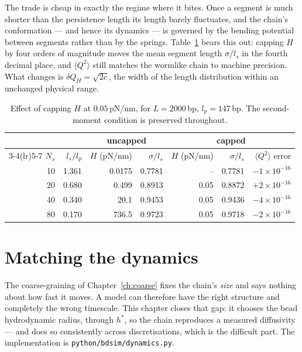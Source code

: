 \documentclass[11pt,a4paper]{report}
\newcommand{\code}[1]{\texttt{\seqsplitcode{#1}}}
\newcommand{\seqsplitcode}[1]{#1}
\begin{document}
The trade is cheap in exactly the regime where it bites. Once a segment is much
shorter than the persistence length its length barely fluctuates, and the chain's
conformation --- and hence its dynamics --- is governed by the bending potential
between segments rather than by the springs. Table~\ref{tab:hcap} bears this out:
capping $H$ by four orders of magnitude moves the mean segment length
$\sigma/l_s$ in the fourth decimal place, and $\langle Q^2\rangle$ still matches
the wormlike chain to machine precision. What changes is $\delta Q_H = \sqrt{2c}$,
the width of the length distribution within an unchanged physical range.

\begin{table}[ht]
\centering
\caption{Effect of capping $H$ at $0.05$\,pN/nm, for $L = 2000$\,bp,
$l_p = 147$\,bp. The second-moment condition is preserved throughout.}
\label{tab:hcap}
\begin{tabular}{@{}rrrrrrr@{}}
\toprule
 & & \multicolumn{2}{c}{uncapped} & \multicolumn{3}{c}{capped} \\
\cmidrule(lr){3-4}\cmidrule(lr){5-7}
$N_s$ & $l_s/l_p$ & $H$ (pN/nm) & $\sigma/l_s$ & $H$ (pN/nm) & $\sigma/l_s$ & $\langle Q^2\rangle$ error \\
\midrule
10 & 1.361 & 0.0175 & 0.7781 & --      & 0.7781 & $-1\times10^{-16}$ \\
20 & 0.680 & 0.499  & 0.8913 & 0.05    & 0.8872 & $+2\times10^{-16}$ \\
40 & 0.340 & 20.1   & 0.9453 & 0.05    & 0.9436 & $-4\times10^{-16}$ \\
80 & 0.170 & 736.5  & 0.9723 & 0.05    & 0.9718 & $-2\times10^{-16}$ \\
\bottomrule
\end{tabular}
\end{table}

\chapter{Matching the dynamics}
\label{ch:dynamics}

The coarse-graining of Chapter~\ref{ch:coarse} fixes the chain's \emph{size} and
says nothing about how fast it moves. A model can therefore have the right
structure and completely the wrong timescale. This chapter closes that gap: it
chooses the bead hydrodynamic radius, through $h^{*}$, so the chain reproduces a
measured diffusivity --- and does so consistently across discretisations, which is
the difficult part. The implementation is \code{python/bdsim/dynamics.py}.
\end{document}
